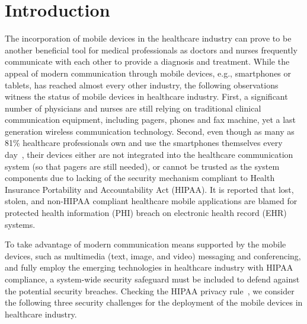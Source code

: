 \section{Introduction}

The incorporation of mobile devices in the healthcare industry can
prove to be another beneficial tool for medical professionals 
as doctors and
nurses frequently communicate with each other to provide a diagnosis
and treatment. While the appeal of modern communication through mobile
devices, e.g., smartphones or tablets, has reached almost every other
industry, the following observations witness the status of mobile
devices in healthcare industry. First, a significant number of
physicians and nurses are still relying on traditional clinical
communication equipment, including pagers, phones and fax machine, yet
a last generation wireless communication technology. Second, even
though as many as 81\% healthcare professionals own and use the
smartphones themselves every day~\cite{manhattan}, their devices
either are not integrated into the healthcare communication system 
(so that pagers are still needed), or cannot be trusted as the
system components due to lacking of the security mechanism compliant
to Health Insurance Portability and Accountability Act (HIPAA). It is
reported \cite{mdnews} that lost, stolen, and non-HIPAA compliant
healthcare mobile applications are blamed for protected health
information (PHI) breach on electronic health record (EHR) systems. 

To take advantage of modern communication means supported by the
mobile devices, such as multimedia (text, image, and video) messaging
and conferencing, and fully employ the emerging technologies in
healthcare industry with HIPAA compliance, a system-wide security
safeguard must be included to defend against the potential security
breaches. Checking the HIPAA privacy rule~\cite{hipaarule}, we
consider the following three security challenges for the deployment of
the mobile devices in healthcare industry.

